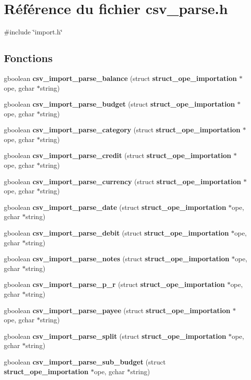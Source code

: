 \section{Référence du fichier csv\_\-parse.h}
\label{csv__parse_8h}
{\ttfamily \#include \char`\"{}import.h\char`\"{}}\par
\subsection*{Fonctions}
\begin{DoxyCompactItemize}
\item 
gboolean {\bf csv\_\-import\_\-parse\_\-balance} (struct {\bf struct\_\-ope\_\-importation} $\ast$ope, gchar $\ast$string)
\item 
gboolean {\bf csv\_\-import\_\-parse\_\-budget} (struct {\bf struct\_\-ope\_\-importation} $\ast$ope, gchar $\ast$string)
\item 
gboolean {\bf csv\_\-import\_\-parse\_\-category} (struct {\bf struct\_\-ope\_\-importation} $\ast$ope, gchar $\ast$string)
\item 
gboolean {\bf csv\_\-import\_\-parse\_\-credit} (struct {\bf struct\_\-ope\_\-importation} $\ast$ope, gchar $\ast$string)
\item 
gboolean {\bf csv\_\-import\_\-parse\_\-currency} (struct {\bf struct\_\-ope\_\-importation} $\ast$ope, gchar $\ast$string)
\item 
gboolean {\bf csv\_\-import\_\-parse\_\-date} (struct {\bf struct\_\-ope\_\-importation} $\ast$ope, gchar $\ast$string)
\item 
gboolean {\bf csv\_\-import\_\-parse\_\-debit} (struct {\bf struct\_\-ope\_\-importation} $\ast$ope, gchar $\ast$string)
\item 
gboolean {\bf csv\_\-import\_\-parse\_\-notes} (struct {\bf struct\_\-ope\_\-importation} $\ast$ope, gchar $\ast$string)
\item 
gboolean {\bf csv\_\-import\_\-parse\_\-p\_\-r} (struct {\bf struct\_\-ope\_\-importation} $\ast$ope, gchar $\ast$string)
\item 
gboolean {\bf csv\_\-import\_\-parse\_\-payee} (struct {\bf struct\_\-ope\_\-importation} $\ast$ope, gchar $\ast$string)
\item 
gboolean {\bf csv\_\-import\_\-parse\_\-split} (struct {\bf struct\_\-ope\_\-importation} $\ast$ope, gchar $\ast$string)
\item 
gboolean {\bf csv\_\-import\_\-parse\_\-sub\_\-budget} (struct {\bf struct\_\-ope\_\-importation} $\ast$ope, gchar $\ast$string)

\end{DoxyCompactItemize}

